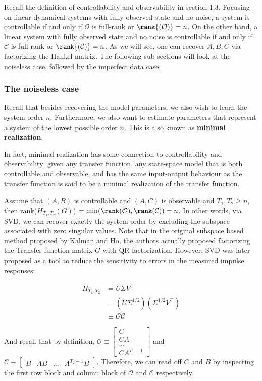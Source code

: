 \documentclass{article}[12pt]
\begin{document}
Recall the definition of controllability and observability in section 1.3. Focusing on linear dynamical systems with fully observed state and no noise, a system is controllable if and only if $\mathcal{O}$ is full-rank or $\rank{(\mathcal{O})} = n$. On the other hand, a linear system with fully observed state and no noise is controllable if and only if $\mathcal{C}$ is full-rank or $\rank{(\mathcal{C})} = n$. As we will see, one can recover $A, B, C$ via factorizing the Hankel matrix. The following sub-sections will look at the noiseless case, followed by the imperfect data case.

\subsubsection{The noiseless case}

Recall that besides recovering the model parameters, we also wish to learn the system order $n$. Furthermore, we also want to estimate parameters that represent a system of the lowest possible order $n$. This is also known as \textbf{minimal realization}.

In fact, minimal realization has some connection to controllability and observability: given any transfer function, any state-space model that is both controllable and observable, and has the same input-output behaviour as the transfer function is said to be a minimal realization of the transfer function.

Assume that $(A, B)$ is controllable and $(A, C)$ is observable and $T_1, T_2 \geq n$, then rank($H_{T_1, T_2}(G)$) $ = \min(\rank(\mathcal{O}), \rank(\mathcal{C})) = n$. In other words, via SVD, we can recover exactly the system order by excluding the subspace associated with zero singular values. Note that in the original subspace based method proposed by Kalman and Ho, the authors actually proposed factorizing the Transfer function matrix $G$ with QR factorization. However, SVD was later proposed as a tool to reduce the sensitivity to errors in the measured impulse responses:

\begin{align*}
    H_{T_1, T_2} &= U\Sigma V^\top\\
    &= (U\Sigma^{1/2})(\Sigma^{1/2}V^\top)\\
    &\equiv \mathcal{O}\mathcal{C}
\end{align*}

And recall that by definition, $\mathcal{O} \equiv \begin{bmatrix}C\\ CA\\...\\CA^{T_1-1}
\end{bmatrix}$ and $\mathcal{C} \equiv \begin{bmatrix}B &AB &... &A^{T_2-1}B
\end{bmatrix}$. Therefore, we can read off $C$ and $B$ by inspecting the first row block and column block of $\mathcal{O}$ and $\mathcal{C}$ respectively.
\end{document}
